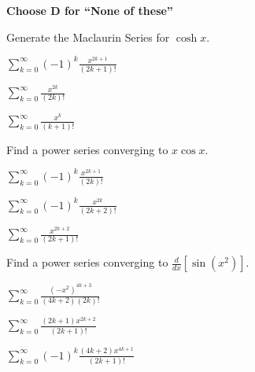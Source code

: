 \documentclass[12pt]{exam}
\newcommand{\<}{\langle}
\renewcommand{\>}{\rangle}
\begin{document}
\begin{center}
\end{center}
\vspace{0.1in}

\vspace{12pt}

\textbf{Choose D for ``None of these''}

\begin{questions}\setcounter{question}{44}

\question
Generate the Maclaurin Series for \(\cosh x\).
\begin{choices}
\item \(\sum_{k=0}^\infty(-1)^k\frac{x^{2k+1}}{(2k+1)!}\)
\item \(\sum_{k=0}^\infty\frac{x^{2k}}{(2k)!}\)
\item \(\sum_{k=0}^\infty\frac{x^k}{(k+1)!}\)
\end{choices}

\question
Find a power series converging to \(x\cos x\).
\begin{choices}
\item \(\sum_{k=0}^\infty(-1)^k\frac{x^{2k+1}}{(2k)!}\)
\item \(\sum_{k=0}^\infty(-1)^k\frac{x^{2k}}{(2k+2)!}\)
\item \(\sum_{k=0}^\infty\frac{x^{2k+2}}{(2k+1)!}\)
\end{choices}

\question
Find a power series converging to \(\frac{d}{dx}[\sin(x^2)]\).
\begin{choices}
\item \(\sum_{k=0}^\infty\frac{(-x^2)^{4k+3}}{(4k+2)(2k)!}\)
\item \(\sum_{k=0}^\infty\frac{(2k+1)x^{2k+2}}{(2k+1)!}\)
\item \(\sum_{k=0}^\infty(-1)^k\frac{(4k+2)x^{4k+1}}{(2k+1)!}\)
\end{choices}

\end{questions}
\end{document}
